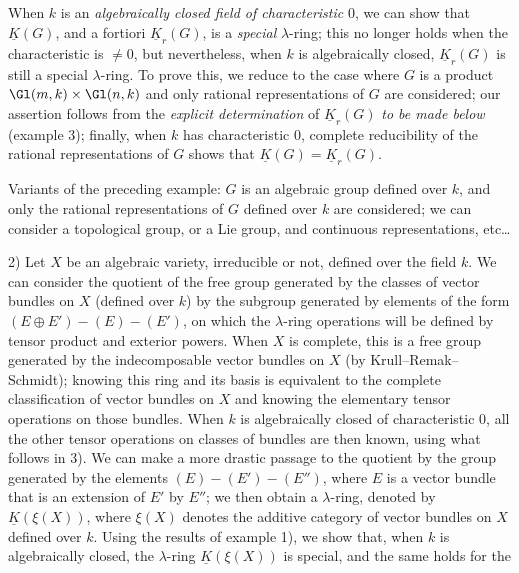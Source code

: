 When $k$ is an \emph{algebraically closed field of characteristic} $0$, we can show that $\underline{K}(G)$, and a fortiori $\underline{K}_r(G)$, is a \emph{special} $\lambda$-ring; this no longer holds when the characteristic is $\neq 0$, but nevertheless, when $k$ is algebraically closed\SGAAuthorFootMark{*}, $\underline{K}_r(G)$ is still a special $\lambda$-ring. To prove this, we reduce to the case where $G$ is a product $\Gl(m,k)\times\Gl(n,k)$ and only rational representations of $G$ are considered; our assertion follows from the \emph{explicit determination} of $\underline{K}_r(G)$ \emph{to be made below} (example 3); finally, when $k$ has characteristic $0$, complete reducibility of the rational representations of $G$ shows that $\underline{K}(G)=\underline{K}_r(G)$.

Variants of the preceding example: $G$ is an algebraic group defined over $k$, and only the rational representations of $G$ defined over $k$ are considered; we can consider a topological group, or a Lie group, and continuous representations, etc\dots{}

2) Let $X$ be an algebraic variety, irreducible or not, defined over the field $k$. We can consider the quotient of the free group generated by the classes of vector bundles on $X$ (defined over $k$) by the subgroup generated by elements of the form $(E\oplus E')-(E)-(E')$, on which the $\lambda$-ring operations will be defined by tensor product and exterior powers. When $X$ is complete, this is a free group generated by the indecomposable vector bundles on $X$ (by Krull--Remak--Schmidt); knowing this ring and its basis is equivalent to the complete classification of vector bundles on $X$ and knowing the elementary tensor operations on those bundles. When $k$ is algebraically closed of characteristic $0$, all the other tensor operations on classes of bundles are then known, using what follows in 3). We can make a more drastic passage to the quotient by the group generated by the elements $(E)-(E')-(E'')$, where $E$ is a vector bundle that is an extension of $E'$ by $E''$; we then obtain a $\lambda$-ring, denoted by $\underline{K}(\xi(X))$, where $\xi(X)$ denotes the additive category of vector bundles on $X$ defined over $k$. Using the results of example 1), we show that, when $k$ is algebraically closed, the $\lambda$-ring $\underline{K}(\xi(X))$ is special, and the same holds for the

